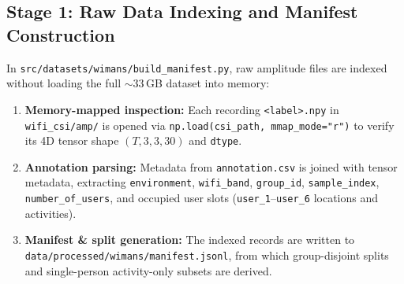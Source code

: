 \documentclass[11pt,a4paper]{article}
\begin{document}
\subsection{Stage 1: Raw Data Indexing and Manifest Construction}
In \texttt{src/datasets/wimans/build\_manifest.py}, raw amplitude files are indexed without loading the full $\sim$33\,GB dataset into memory:
\begin{enumerate}
    \item \textbf{Memory-mapped inspection:} Each recording \texttt{<label>.npy} in \texttt{wifi\_csi/amp/} is opened via \texttt{np.load(csi\_path, mmap\_mode="r")} to verify its 4D tensor shape $(T, 3, 3, 30)$ and \texttt{dtype}.
    \item \textbf{Annotation parsing:} Metadata from \texttt{annotation.csv} is joined with tensor metadata, extracting \texttt{environment}, \texttt{wifi\_band}, \texttt{group\_id}, \texttt{sample\_index}, \texttt{number\_of\_users}, and occupied user slots (\texttt{user\_1}--\texttt{user\_6} locations and activities).
    \item \textbf{Manifest \& split generation:} The indexed records are written to \texttt{data/processed/wimans/manifest.jsonl}, from which group-disjoint splits and single-person activity-only subsets are derived.
\end{enumerate}
\end{document}
